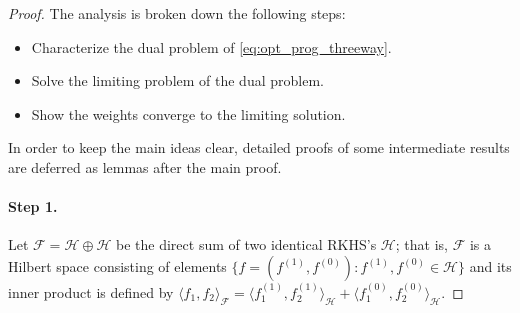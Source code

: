 \documentclass[12pt]{article}
\newcommand{\prob}{\mathbb{P}}
\begin{document}
\begin{proof}
	
	The analysis is broken down the following steps:
	\begin{itemize}[leftmargin=5em, itemsep=0pt, parsep=0pt, topsep=.6em]
		\item[Step 1.] Characterize the dual problem of \eqref{eq:opt_prog_threeway}.
		\item[Step 2.] Solve the limiting problem of the dual problem.
		\item[Step 3.] Show the weights converge to the limiting solution.
	\end{itemize}
	In order to keep the main ideas clear, detailed proofs of some intermediate results are deferred as lemmas after the main proof.
	
	\paragraph{Step 1.} 
	Let $\mathcal{F} = \mathcal{H} \oplus \mathcal{H}$ be the direct sum of two identical RKHS's $\mathcal{H}$; that is, $\mathcal{F}$ is a Hilbert space consisting of elements $\{f = (f^{(1)}, f^{(0)}): f^{(1)}, f^{(0)} \in \mathcal{H}\}$ and its inner product is defined by 
	$\langle f_1, f_2 \rangle_{\mathcal{F}} 
	= \langle f^{(1)}_1, f^{(1)}_2 \rangle_\mathcal{H} 
	+ \langle f^{(0)}_1, f^{(0)}_2 \rangle_\mathcal{H}$.
	

\end{proof}
\end{document}
